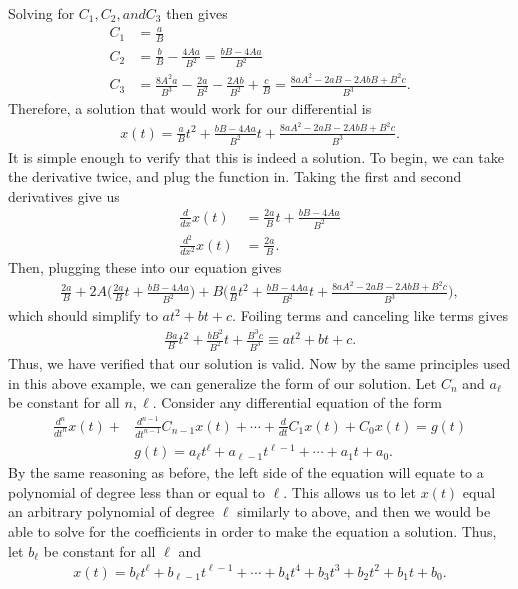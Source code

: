 Solving for $C_1, C_2, and C_3$ then gives
\begin{align}
C_1 &=\frac{a}{B} \\
C_2 &=\frac{b}{B}-\frac{4Aa}{B^2} = \frac{bB-4Aa}{B^2} \\
C_3 &= \frac{8A^2a}{B^3}-\frac{2a}{B^2}-\frac{2Ab}{B^2}+\frac{c}{B}=\frac{8aA^2-2aB-2AbB+B^2c}{B^3}.
\end{align}
Therefore, a solution that would work for our differential is
\begin{align}
x(t)=\frac{a}{B}t^2+\frac{bB-4Aa}{B^2}t+\frac{8aA^2-2aB-2AbB+B^2c}{B^3}.
\end{align}
It is simple enough to verify that this is indeed a solution. To begin, we can take the derivative twice, and plug the function in. Taking the first and second derivatives give us
\begin{align}
\frac{d}{dx}x(t)&= \frac{2a}{B}t+\frac{bB-4Aa}{B^2} \\
\frac{d^2}{dx^2}x(t) &= \frac{2a}{B}.
\end{align}
Then, plugging these into our equation gives
\begin{align}
\frac{2a}{B}+2A\bigg( \frac{2a}{B}t+\frac{bB-4Aa}{B^2} \bigg) +B\bigg(\frac{a}{B}t^2+\frac{bB-4Aa}{B^2}t+\frac{8aA^2-2aB-2AbB+B^2c}{B^3} \bigg),
\end{align}
which should simplify to $at^2+bt+c$. Foiling terms and canceling like terms gives
\begin{align}
\frac{Ba}{B}t^2+\frac{bB^2}{B^2}t+\frac{B^3c}{B^3} \equiv at^2+bt+c.
\end{align}
Thus, we have verified that our solution is valid. Now by the same principles used in this above example, we can generalize the form of our solution. Let $C_n$ and $a_\ell $ be constant for all $n, \ell $. Consider any differential equation of the form
\begin{align}
\frac{d^n}{dt^n}x(t)+&\frac{d^{n-1}}{dt^{n-1}}C_{n-1}x(t)+\cdots+\frac{d}{dt}C_1x(t)+C_0x(t)=g(t) \\
& g(t)=a_\ell t^\ell +a_{\ell -1}t^{\ell -1}+\cdots+a_1t+a_0.
\end{align} 
By the same reasoning as before, the left side of the equation will equate to a polynomial of degree less than or equal to $\ell $. This allows us to let $x(t)$ equal an arbitrary polynomial of degree $\ell $ similarly to above, and then we would be able to solve for the coefficients in order to make the equation a solution. Thus, let $b_\ell $ be constant for all $\ell $ and
\begin{align}
x(t)=b_\ell t^\ell +b_{\ell -1}t^{\ell -1}+\cdots+b_4t^4+b_3t^3+b_2t^2+b_1t+b_0.
\end{align}
